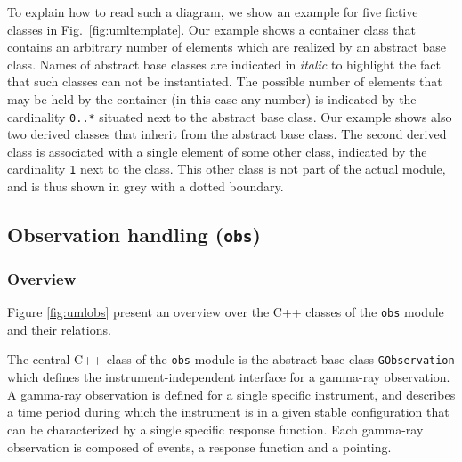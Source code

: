 \documentclass{article}[12pt,a4]
\begin{document}
To explain how to read such a diagram, we show an example for five fictive classes in
Fig.~\ref{fig:umltemplate}.
Our example shows a container class that contains an arbitrary number of elements which
are realized by an abstract base class.
Names of abstract base classes are indicated in {\it italic} to highlight the fact that such classes
can not be instantiated.
The possible number of elements that may be held by the container (in this case any number)
is indicated by the cardinality {\tt 0..*} situated next to the abstract base class.
Our example shows also two derived classes that inherit from the abstract base class.
The second derived class is associated with a single element of some other class, indicated by 
the cardinality {\tt 1} next to the class.
This other class is not part of the actual module, and is thus shown in grey with a dotted boundary.

\begin{figure*}[!h]
 \center
 \caption{UML diagram illustrating the relation between five classes.}
 \label{fig:umltemplate}
\end{figure*}


\subsection{Observation handling ({\tt obs})}
\label{sec:obs}

\subsubsection{Overview}

Figure \ref{fig:umlobs} present an overview over the C++ classes of the {\tt obs} module and their
relations.

\begin{figure*}[!h]
 \center
 \caption{Relation of C++ classes in the {\tt obs} module.}
 \label{fig:umlobs}
\end{figure*}

The central C++ class of the {\tt obs} module is the abstract base class {\tt GObservation} which
defines the instrument-independent interface for a gamma-ray observation.
A gamma-ray observation is defined for a single specific instrument, and describes a time period
during which the instrument is in a given stable configuration that can be characterized by a 
single specific response function.
Each gamma-ray observation is composed of events, a response function and a pointing.
\end{document}
